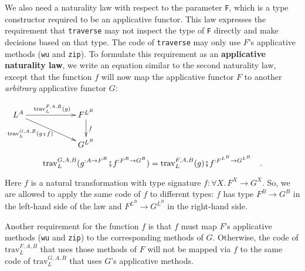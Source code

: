 We also need a naturality law with respect to the parameter \lstinline!F!,
which is a type constructor required to be an applicative functor.
This law expresses the requirement that \lstinline!traverse! may
not inspect the type of \lstinline!F! directly and make decisions
based on that type. The code of \lstinline!traverse! may only use
$F$\textsf{'}s applicative methods (\lstinline!wu! and \lstinline!zip!).
To formulate this requirement as an \textbf{applicative naturality
law},
we write an equation similar to the second naturality law, except
that the function $f$ will now map the applicative functor $F$ to
another \emph{arbitrary} applicative functor $G$:
\noindent \begin{center}
$\xymatrix{\xyScaleY{1.7pc}\xyScaleX{5.0pc}L^{A}\ar[rd]\sb(0.4){\text{trav}_{L}^{G,A,B}(g\bef f)~~}\ar[r]\sp(0.5){\text{trav}_{L}^{F,A,B}(g)} & F^{L^{B}}\ar[d]\sp(0.45){f}\\
 & G^{L^{B}}
}
$
\begin{equation}
\text{trav}_{L}^{G,A,B}(g^{:A\rightarrow F^{B}}\bef f^{:F^{B}\rightarrow G^{B}})=\text{trav}_{L}^{F,A,B}(g)\bef f^{:F^{L^{B}}\rightarrow G^{L^{B}}}\quad.\label{eq:traverse-applicative-naturality-law}
\end{equation}
\par\end{center}

\begin{flushleft}
Here $f$ is a natural transformation with type signature $f:\forall X.\,F^{X}\rightarrow G^{X}$.
So, we are allowed to apply the same code of $f$ to different types:
$f$ has type $F^{B}\rightarrow G^{B}$ in the left-hand side of the
law and $F^{L^{B}}\rightarrow G^{L^{B}}$ in the right-hand side.
\par\end{flushleft}

Another requirement for the function $f$ is that $f$ must map $F$\textsf{'}s
applicative methods (\lstinline!wu! and \lstinline!zip!) to the
corresponding methods of $G$. Otherwise, the code of $\text{trav}_{L}^{F,A,B}$
that uses those methods of $F$ will not be mapped via $f$ to the
same code of $\text{trav}_{L}^{G,A,B}$ that uses $G$\textsf{'}s applicative
methods. 


